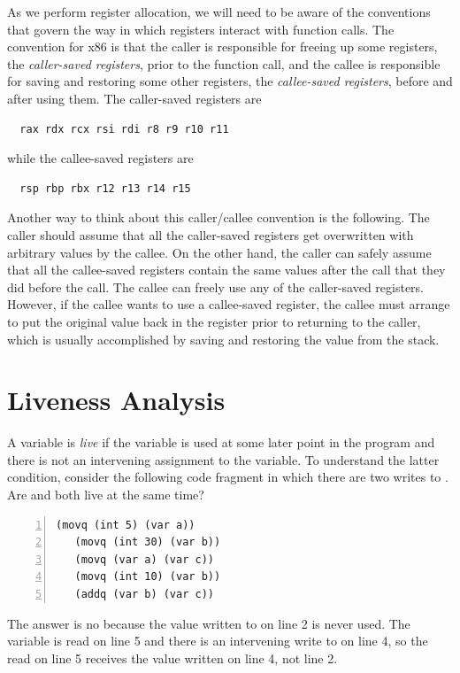 \documentclass[11pt]{book}
\begin{document}
As we perform register allocation, we will need to be aware of the
conventions that govern the way in which registers interact with
function calls. The convention for x86 is that the caller is
responsible for freeing up some registers, the \emph{caller-saved
  registers}, prior to the function call, and the callee is
responsible for saving and restoring some other registers, the
\emph{callee-saved registers}, before and after using them. The
caller-saved registers are
\begin{lstlisting}
  rax rdx rcx rsi rdi r8 r9 r10 r11
\end{lstlisting}
while the callee-saved registers are
\begin{lstlisting}
  rsp rbp rbx r12 r13 r14 r15
\end{lstlisting}
Another way to think about this caller/callee convention is the
following. The caller should assume that all the caller-saved registers
get overwritten with arbitrary values by the callee.  On the other
hand, the caller can safely assume that all the callee-saved registers
contain the same values after the call that they did before the call.
The callee can freely use any of the caller-saved registers.  However,
if the callee wants to use a callee-saved register, the callee must
arrange to put the original value back in the register prior to
returning to the caller, which is usually accomplished by saving and
restoring the value from the stack.


\section{Liveness Analysis}
\label{sec:liveness-analysis}

A variable is \emph{live} if the variable is used at some later point
in the program and there is not an intervening assignment to the
variable.
%
To understand the latter condition, consider the following code
fragment in which there are two writes to . Are  and
 both live at the same time?
\begin{lstlisting}[numbers=left,numberstyle=\tiny]
   (movq (int 5) (var a))
   (movq (int 30) (var b))
   (movq (var a) (var c))
   (movq (int 10) (var b))
   (addq (var b) (var c))
\end{lstlisting}
The answer is no because the value  written to  on
line 2 is never used. The variable  is read on line 5 and
there is an intervening write to  on line 4, so the read on
line 5 receives the value written on line 4, not line 2.
\end{document}
